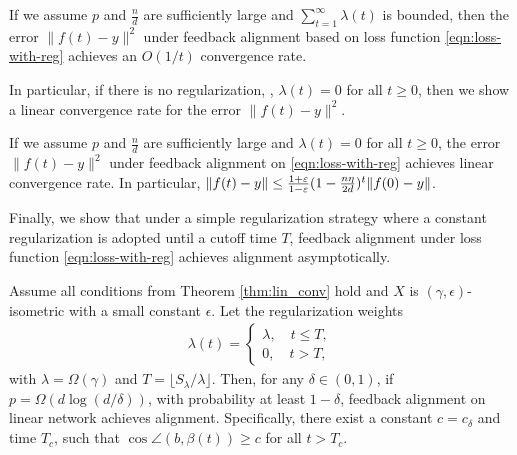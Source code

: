 \begin{theorem}[informal]
    If we assume $p$ and $\frac{n}{d}$ are sufficiently large and $\sum_{t=1}^\infty \lambda(t)$ is bounded, then the error $\|f(t) - y\|^2$ under feedback alignment based on loss function \eqref{eqn:loss-with-reg} achieves an $O(1/t)$ convergence rate.
\end{theorem}
In particular, if there is no regularization, \ie, $\lambda(t)=0$ for all $t\geq 0$, then we show a linear convergence rate for the error $\|f(t) - y\|^2$.
\begin{corollary}[informal]
    If we assume $p$ and $\frac{n}{d}$ are sufficiently large and $\lambda(t) = 0$ for all $t\geq 0$, the error $\|f(t) - y\|^2$ under feedback alignment on \eqref{eqn:loss-with-reg} achieves linear convergence rate. In particular, $\|f(t) - y\| \leq \frac{1+\varepsilon}{1-\varepsilon}(1-\frac{n\eta}{2d})^t \|f(0) - y\|$.
\end{corollary}
Finally, we show that under a simple regularization strategy where a constant regularization is adopted until a cutoff time $T$, feedback alignment under loss function \eqref{eqn:loss-with-reg} achieves alignment asymptotically.
\begin{theorem}
\label{thm:lin_align}
Assume all conditions from Theorem \ref{thm:lin_conv} hold and $X$ is $(\gamma, \epsilon)$-isometric with a small constant $\epsilon$. Let the regularization weights
\begin{align*}
\lambda(t) = 
\begin{cases}
    \lambda, \quad t\leq T,\\
    0, \quad t > T,
\end{cases}
\end{align*}
with $\lambda=\Omega(\gamma)$ and $T = \lfloor S_\lambda/\lambda\rfloor$. Then, for any $\delta\in(0,1)$, if $p = \Omega(d\log(d/\delta))$, with probability at least $1-\delta$, feedback alignment on linear network achieves alignment. Specifically, there exist a constant $c=c_\delta$ and time $T_c$, such that $\cos\angle(b, \beta(t))\geq c$ for all $t>T_c$.
\end{theorem}



